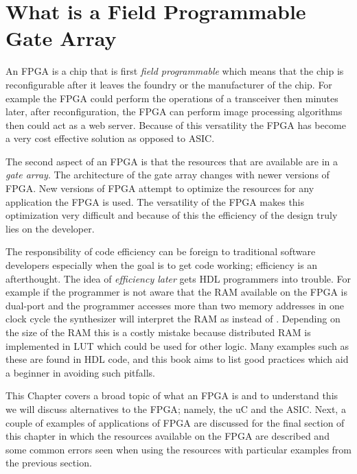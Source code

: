 \chapter{What is a Field Programmable Gate Array}

An \ac{FPGA} is a chip that is first \emph{field programmable} which means that the chip is reconfigurable after it leaves the foundry or the manufacturer of the chip. For example the \ac{FPGA} could perform the operations of a transceiver then minutes later, after reconfiguration, the \ac{FPGA} can perform image processing algorithms then could act as a web server. Because of this versatility the \ac{FPGA} has become a very cost effective solution as opposed to \ac{ASIC}.

The second aspect of an \ac{FPGA} is that the resources that are available are in a \emph{gate array}. The architecture of the gate array changes with newer versions of \ac{FPGA}. New versions of \ac{FPGA} attempt to optimize the resources for any application the \ac{FPGA} is used. The versatility of the \ac{FPGA} makes this optimization very difficult and because of this the efficiency of the design truly lies on the developer.

The responsibility of code efficiency can be foreign to traditional software developers especially when the goal is to get code working; efficiency is an afterthought. The idea of \emph{efficiency later} gets \ac{HDL} programmers into trouble. For example if the programmer is not aware that the \ac{RAM} available on the \ac{FPGA} is dual-port and the programmer accesses more than two memory addresses in one clock cycle the synthesizer will interpret the \ac{RAM} as  instead of . Depending on the size of the \ac{RAM} this is a costly mistake because distributed \ac{RAM} is implemented in \ac{LUT} which could be used for other logic. Many examples such as these are found in \ac{HDL} code, and this book aims to list good practices which aid a beginner in avoiding such pitfalls.

This Chapter covers a broad topic of what an \ac{FPGA} is and to understand this we will discuss alternatives to the \ac{FPGA}; namely, the \ac{uC} and the \ac{ASIC}. Next, a couple of examples of applications of \ac{FPGA} are discussed for the final section of this chapter in which the resources available on the \ac{FPGA} are described and some common errors seen when using the resources with particular examples from the previous section. 

